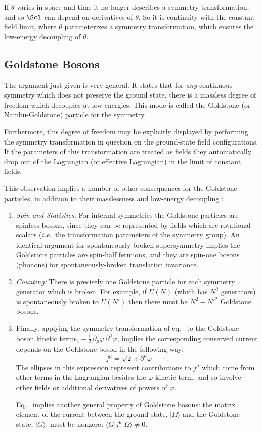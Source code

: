 \documentclass[12pt]{article}
\def\ie{{\it i.e.\/}}
\def\hf{{\frac12}}
\def\eq{\begin{equation}}
\def\eeq{\end{equation}}
\begin{document}
If $\theta$ varies in space and time it no longer describes a
symmetry transformation, and so $\Scl$ can depend on 
derivatives of $\theta$. So it is continuity with the constant-field
limit, where $\theta$ parameterizes a symmetry transformation,
which ensures the low-energy decoupling of $\theta$.

\subsection{Goldstone Bosons}

The argument just given is very general. It states that for
{\sl any} continuous symmetry which does not preserve the
ground state, there is a massless degree of freedom which
decouples at low energies. This mode is called the Goldstone
(or Nambu-Goldstone) particle for the symmetry. 

Furthermore, this degree of
freedom may be explicitly displayed by performing the
symmetry transformation in question on the ground-state
field configurations. If the parameters of this transformation
are treated as fields they automatically drop out of the
Lagrangian (or effective Lagrangian) in the limit of constant
fields. 

This observation implies a number of other consequences
for the Goldstone particles, in addition to their masslessness
and low-energy decoupling \cite{Guralnik68,LeutwylerGB,Hofmann}:

\begin{enumerate}
\item
{\it Spin and Statistics:}
For internal symmetries the Goldstone particles are spinless bosons,
since they can be represented by fields which are rotational scalars
(\ie\ the transformation parameters of the symmetry group). An
identical argument for spontaneously-broken supersymmetry 
implies the Goldstone particles are spin-half fermions, and they
are spin-one bosons (phonons)
for spontaneously-broken translation invariance.
%
\item
{\it Counting:}
There is precisely one Goldstone particle for each symmetry
generator which is broken. For example, if $U(N)$ (which
has $N^2$ generators) is spontaneously broken to $U(N')$
then there must be $N^2 - {N'}^2$ Goldstone bosons. 
%
\item
Finally, applying the symmetry transformation of eq.~
to the Goldstone boson kinetic terms, $-\, \hf \, \partial_\mu \varphi
\, \partial^\mu \varphi$, implies the corresponding conserved
current depends on the Goldstone boson in the following way: 
%
\eq
\label{abelgbncex}
j^\mu = \sqrt{2} \; v \; \partial^\mu \varphi + \cdots \, . 
\eeq
%
The ellipses in this expression represent contributions to $j^\mu$ which come
from other terms in the Lagrangian besides the $\varphi$ kinetic term,
and so involve other fields or additional derivatives of powers of
$\varphi$. 

Eq.~ implies another general property of Goldstone
bosons: the matrix element of the current between the ground state,
$|\Omega\rangle$ and the Goldstone state, $|G\rangle$, must
be nonzero: $\langle{G}| j^\mu | \Omega\rangle \neq 0$. 
\end{enumerate}
\end{document}
